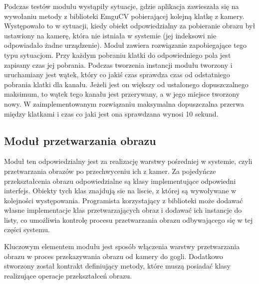 \documentclass[a4paper,11pt,twoside]{report}
\theoremstyle{definition}
\begin{document}
Podczas testów modułu wystąpiły sytuacje, gdzie aplikacja zawieszała się na wywołaniu metody z biblioteki EmguCV pobierającej kolejną klatkę z kamery. Występowało to w sytuacji, kiedy obiekt odpowiedzialny za pobieranie obrazu był ustawiony na kamerę, która nie istniała w systemie (jej indeksowi nie odpowiadało żadne urządzenie). Moduł zawiera rozwiązanie zapobiegające tego typu sytuacjom. Przy każdym pobraniu klatki do odpowiedniego pola jest zapisany czas jej pobrania. Podczas tworzenia instancji modułu tworzony i uruchamiany jest wątek, który co jakiś czas sprawdza czas od odstatniego pobrania klatki dla kanału. Jeżeli jest on większy od ustalonego dopuszczalnego maksimum, to wątek tego kanału jest przerywany, a w jego miejsce tworzony nowy. 
W zaimplementowanym rozwiązaniu maksymalna dopuszczalna przerwa między klatkami i czas co jaki jest ona sprawdzana wynosi 10 sekund.

\subsection {Moduł przetwarzania obrazu}

Moduł ten odpowiedzialny jest za realizację warstwy pośredniej w  systemie, czyli przetwarzania obrazów po przechwyceniu ich z kamer. Za pojedyńcze przekształcenia obrazu odpowiedzialne są klasy implementujące odpowiedni interfejs. Obiekty tych klas znajdują sie na liscie, z której są wywoływane w kolejności występowania. Programista korzystający z biblioteki może dodawać własne implementacje klas przetwarzających obraz i dodawać ich instancje do listy, co umożliwia kontrolę procesu przetwarzania obrazu odbywającego się w tej części systemu. 

Kluczowym elementem modułu jest sposób włączenia warstwy przetwarzania obrazu w proces przekazywania obrazu od kamery do gogli. Dodatkowo stworzony został kontrakt definiujący metody, które muszą posiadać klasy realizujące operacje przekształceń obrazu.
\end{document}
